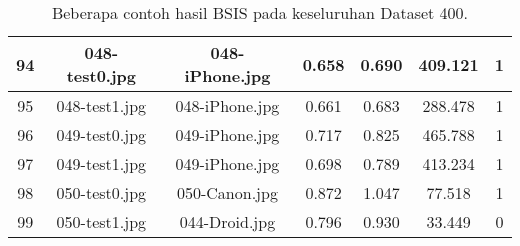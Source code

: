 \begin{table}[H]
\begin{tabular}{|c|c|c|c|c|c|c|}
		\hline
		94  & 048-test0.jpg & 048-iPhone.jpg & 0.658        & 0.690       & 409.121       & 1         \\ 
		\hline
		95  & 048-test1.jpg & 048-iPhone.jpg & 0.661        & 0.683       & 288.478       & 1         \\ 
		\hline
		96  & 049-test0.jpg & 049-iPhone.jpg & 0.717        & 0.825       & 465.788       & 1         \\ 
		\hline
		97  & 049-test1.jpg & 049-iPhone.jpg & 0.698        & 0.789       & 413.234       & 1         \\ 
		\hline
		98  & 050-test0.jpg & 050-Canon.jpg  & 0.872        & 1.047       & 77.518        & 1         \\ 
		\hline
		99  & 050-test1.jpg & 044-Droid.jpg  & 0.796        & 0.930       & 33.449        & 0         \\
		\hline
	\end{tabular}
	\caption{Beberapa contoh hasil BSIS pada keseluruhan Dataset 400.}
	\label{tab:result_full_400}
\end{table}

